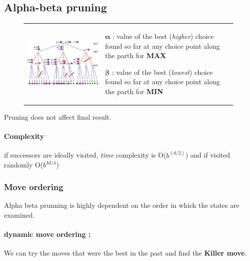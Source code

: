 \subsection{Alpha-beta pruning}
\begin{figure}[h]
\begin{tabular}{m{10cm}m{6cm}}
    \centering
    \includegraphics[width=10cm]{minmax_ex.png}
&

\begin{description}
    \item $\mathbf{\alpha}$ : value of the best (\textit{higher}) choice found
        so far at any choice point along the parth for \textbf{MAX}
    \item $\mathbf{\beta}$ : value of the best (\textit{lowest}) choice found
    so far at any choice point along the parth for \textbf{MIN}
\end{description}
\end{tabular}
\end{figure}

Pruning does not affect final result.

\paragraph{Complexity} if successors are ideally visited, \textit{time} complexity
is O($b^{(d/2)}$) and if visited randomly O($b^{3d/4}$)


\subsubsection{Move ordering}

Alpha beta prunning is highly dependent on the order in which the states are examined.

\paragraph{dynamic move ordering :} We can try the moves that were the best in the past and find the \textbf{Killer move}.


